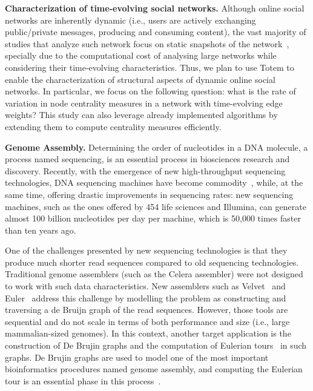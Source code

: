 {\bf Characterization of time-evolving social networks.} Although online social networks are inherently dynamic (i.e., users are actively exchanging public/private messages, producing and consuming content), the vast majority of studies that analyze such network focus on static snapshots of the network~\cite{Willinger2009}, specially due to the computational cost of analysing large networks while considering their time-evolving characteristics. Thus, we plan to use {\sc Totem} to enable the characterization of structural aspects of dynamic online social networks. In particular, we focus on the following question: what is the rate of variation in node centrality measures in a network with time-evolving edge weights? This study can also leverage already implemented algorithms by extending them to compute centrality measures efficiently.

{\bf Genome Assembly.} Determining the order of nucleotides in a DNA molecule, a process named sequencing, is an essential process in biosciences research and discovery. Recently, with the emergence of new high-throughput sequencing technologies, DNA sequencing machines have become commodity~\cite{venter2010multiple}, while, at the same time, offering drastic improvements in sequencing rates: new sequencing machines, such as the ones offered by 454 life sciences and Illumina, can generate almost 100 billion nucleotides per day per machine, which is 50,000 times faster than ten years ago.

One of the challenges presented by new sequencing technologies is that they produce much shorter read sequences compared to old sequencing technologies. Traditional genome assemblers (such as the Celera assembler) were not designed to work with such data characteristics. New assemblers such as Velvet~\cite{Zerbino2008} and Euler~\cite{pevzner2001eulerian} address this challenge by modelling the problem as constructing and traversing a de Bruijn graph of the read sequences. However, those tools are sequential and do not scale in terms of both performance and size (i.e., large mammalian-sized genomes).
In this context, another target application is the construction of De Brujin graphs and the computation of Eulerian tours~\cite{Atallah1984} in such graphs. De Brujin graphs are used to model one of the most important bioinformatics procedures named genome assembly, and computing the Eulerian tour is an essential phase in this process~\cite{pevzner2001eulerian, zerbino2008velvet}.